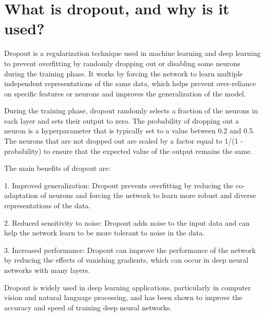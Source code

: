 \section{What is dropout, and why is it used?}
Dropout is a regularization technique used in machine learning and deep learning to prevent overfitting by randomly dropping out or disabling some neurons during the training phase. It works by forcing the network to learn multiple independent representations of the same data, which helps prevent over-reliance on specific features or neurons and improves the generalization of the model.

During the training phase, dropout randomly selects a fraction of the neurons in each layer and sets their output to zero. The probability of dropping out a neuron is a hyperparameter that is typically set to a value between 0.2 and 0.5. The neurons that are not dropped out are scaled by a factor equal to 1/(1 - probability) to ensure that the expected value of the output remains the same.

The main benefits of dropout are:

1. Improved generalization: Dropout prevents overfitting by reducing the co-adaptation of neurons and forcing the network to learn more robust and diverse representations of the data.

2. Reduced sensitivity to noise: Dropout adds noise to the input data and can help the network learn to be more tolerant to noise in the data.

3. Increased performance: Dropout can improve the performance of the network by reducing the effects of vanishing gradients, which can occur in deep neural networks with many layers.

Dropout is widely used in deep learning applications, particularly in computer vision and natural language processing, and has been shown to improve the accuracy and speed of training deep neural networks.

